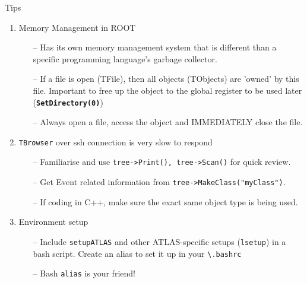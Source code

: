 \documentclass[10pt, aspectratio=169]{beamer}
\begin{document}
\begin{frame}{Tips}
	\begin{enumerate}
		\item
		Memory Management in ROOT
		\begin{itemize}
			\item[--] Has its own memory management system that is different than a specific programming language's garbage collector.
			\item[--] If a file is open (TFile), then all objects (TObjects) are 'owned' by this file. Important to free up the object to the global register to be used later (\textbf{\texttt{SetDirectory(0)}})
			\item[--] Always open a file, access the object and IMMEDIATELY close the file.
		\end{itemize}
		\item
		\texttt{TBrowser} over ssh connection is very slow to respond
		\begin{itemize}
			\item[--] Familiarise and use \texttt{tree->Print(), tree->Scan()} for quick review.
			\item[--] Get Event related information from \texttt{tree->MakeClass("myClass")}.
			\item[--] If coding in C++, make sure the exact same object type is being used.
		\end{itemize}
		\item
		Environment setup
		\begin{itemize}
			\item[--] Include \texttt{setupATLAS} and other ATLAS-specific setups (\texttt{lsetup}) in a bash script. Create an alias to set it up in your \texttt{\textbackslash.bashrc} 
			\item[--] Bash \texttt{alias} is your friend!
		\end{itemize}
	\end{enumerate}
\end{frame}
\end{document}
